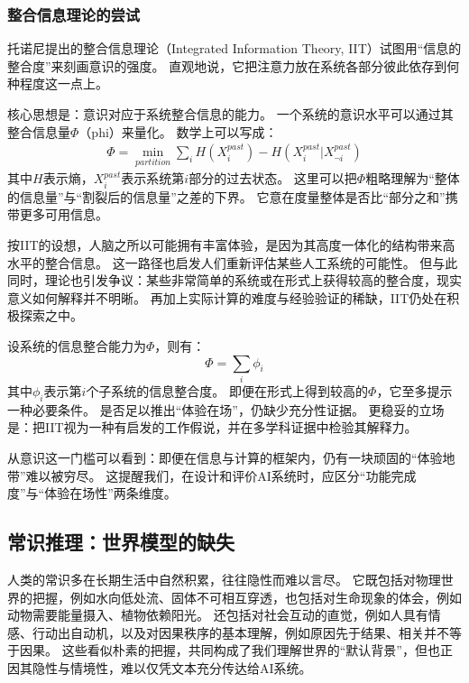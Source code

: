 \subsubsection{整合信息理论的尝试}

托诺尼提出的整合信息理论（Integrated Information Theory, IIT）试图用“信息的整合度”来刻画意识的强度。
直观地说，它把注意力放在系统各部分彼此依存到何种程度这一点上。

核心思想是：意识对应于系统整合信息的能力。
一个系统的意识水平可以通过其整合信息量$\Phi$（phi）来量化。
数学上可以写成：
\begin{align}
\Phi = \min_{partition} \sum_{i} H(X_i^{past}) - H(X_i^{past}|X_{\neg i}^{past})
\end{align}
其中$H$表示熵，$X_i^{past}$表示系统第$i$部分的过去状态。
这里可以把$\Phi$粗略理解为“整体的信息量”与“割裂后的信息量”之差的下界。
它意在度量整体是否比“部分之和”携带更多可用信息。

按IIT的设想，人脑之所以可能拥有丰富体验，是因为其高度一体化的结构带来高水平的整合信息。
这一路径也启发人们重新评估某些人工系统的可能性。
但与此同时，理论也引发争议：某些非常简单的系统或在形式上获得较高的整合度，现实意义如何解释并不明晰。
再加上实际计算的难度与经验验证的稀缺，IIT仍处在积极探索之中。

设系统的信息整合能力为$\Phi$，则有：
\begin{equation}
\Phi = \sum_{i} \phi_i
\end{equation}
其中$\phi_i$表示第$i$个子系统的信息整合度。
即便在形式上得到较高的$\Phi$，它至多提示一种必要条件。
是否足以推出“体验在场”，仍缺少充分性证据。
更稳妥的立场是：把IIT视为一种有启发的工作假说，并在多学科证据中检验其解释力。

从意识这一门槛可以看到：即便在信息与计算的框架内，仍有一块顽固的“体验地带”难以被穷尽。
这提醒我们，在设计和评价AI系统时，应区分“功能完成度”与“体验在场性”两条维度。

\subsection{常识推理：世界模型的缺失}

人类的常识多在长期生活中自然积累，往往隐性而难以言尽。
它既包括对物理世界的把握，例如水向低处流、固体不可相互穿透，也包括对生命现象的体会，例如动物需要能量摄入、植物依赖阳光。
还包括对社会互动的直觉，例如人具有情感、行动出自动机，以及对因果秩序的基本理解，例如原因先于结果、相关并不等于因果。
这些看似朴素的把握，共同构成了我们理解世界的“默认背景”，但也正因其隐性与情境性，难以仅凭文本充分传达给AI系统。

